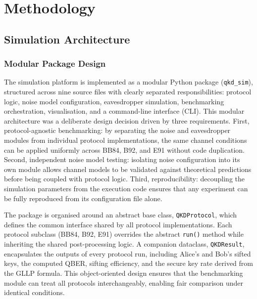 \documentclass[10pt, a4paper]{report}
\begin{document}
\chapter{Methodology}

\section{Simulation Architecture}

\subsection{Modular Package Design}

The simulation platform is implemented as a modular Python package (\texttt{qkd\_sim}), structured across nine source files with clearly separated responsibilities: protocol logic, noise model configuration, eavesdropper simulation, benchmarking orchestration, visualisation, and a command-line interface (CLI). This modular architecture was a deliberate design decision driven by three requirements. First, protocol-agnostic benchmarking: by separating the noise and eavesdropper modules from individual protocol implementations, the same channel conditions can be applied uniformly across BB84, B92, and E91 without code duplication. Second, independent noise model testing: isolating noise configuration into its own module allows channel models to be validated against theoretical predictions before being coupled with protocol logic. Third, reproducibility: decoupling the simulation parameters from the execution code ensures that any experiment can be fully reproduced from its configuration file alone.

The package is organised around an abstract base class, \texttt{QKDProtocol}, which defines the common interface shared by all protocol implementations. Each protocol subclass (BB84, B92, E91) overrides the abstract \texttt{run()} method while inheriting the shared post-processing logic. A companion dataclass, \texttt{QKDResult}, encapsulates the outputs of every protocol run, including Alice's and Bob's sifted keys, the computed QBER, sifting efficiency, and the secure key rate derived from the GLLP formula. This object-oriented design ensures that the benchmarking module can treat all protocols interchangeably, enabling fair comparison under identical conditions.
\end{document}
